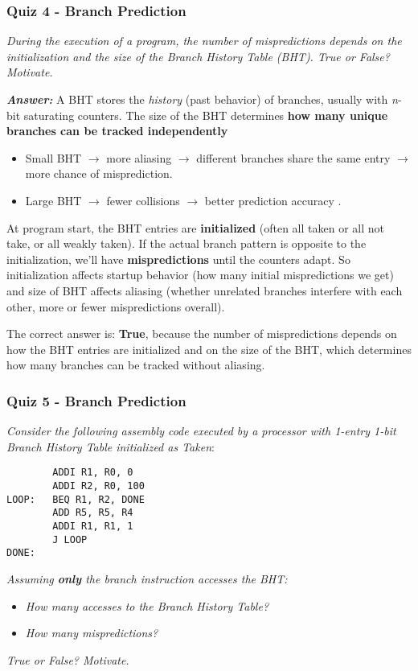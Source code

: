 \newpage

\subsubsection*{Quiz 4 - Branch Prediction}

\emph{During the execution of a program, the number of mispredictions depends on the initialization and the size of the Branch History Table (BHT). True or False? Motivate.}

\highspace
\textcolor{Green3}{\textbf{\emph{Answer:}}} A BHT stores the \emph{history} (past behavior) of branches, usually with \emph{n}-bit saturating counters. The size of the BHT determines \textbf{how many unique branches can be tracked independently}
\begin{itemize}
    \item Small BHT $\rightarrow$ more aliasing $\rightarrow$ different branches share the same entry $\rightarrow$ more chance of misprediction.
    \item Large BHT $\rightarrow$ fewer collisions $\rightarrow$ better prediction accuracy .
\end{itemize}
At program start, the BHT entries are \textbf{initialized} (often all taken or all not take, or all weakly taken). If the actual branch pattern is opposite to the initialization, we'll have \textbf{mispredictions} until the counters adapt. So initialization affects startup behavior (how many initial mispredictions we get) and size of BHT affects aliasing (whether unrelated branches interfere with each other, more or fewer mispredictions overall).

\highspace
The correct answer is: \textbf{True}, because the number of mispredictions depends on how the BHT entries are initialized and on the size of the BHT, which determines how many branches can be tracked without aliasing.

\subsubsection*{Quiz 5 - Branch Prediction}

\emph{Consider the following assembly code executed by a processor with 1-entry 1-bit Branch History Table initialized as Taken}:
\begin{lstlisting}
        ADDI R1, R0, 0
        ADDI R2, R0, 100
LOOP:   BEQ R1, R2, DONE
        ADD R5, R5, R4
        ADDI R1, R1, 1
        J LOOP
DONE:
\end{lstlisting}
\emph{Assuming \textbf{only} the branch instruction accesses the BHT:}
\begin{itemize}
    \item \emph{How many accesses to the Branch History Table?}
    \item \emph{How many mispredictions?}
\end{itemize}
\emph{True or False? Motivate.}

